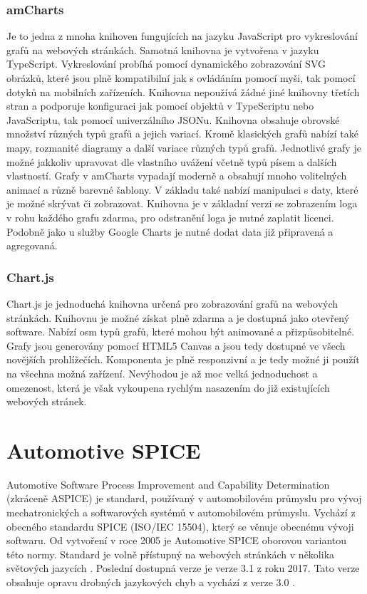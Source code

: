 \documentclass[czech,master]{diploma}
\begin{document}
\subsection{amCharts}
\label{sec:amcharts}
Je to jedna z mnoha knihoven fungujících na jazyku JavaScript pro vykreslování grafů na webových stránkách. Samotná knihovna je vytvořena v jazyku TypeScript. Vykreslování probíhá pomocí dynamického zobrazování SVG obrázků, které jsou plně kompatibilní jak s ovládáním pomocí myši, tak pomocí dotyků na mobilních zařízeních. Knihovna nepoužívá žádné jiné knihovny třetích stran a podporuje konfiguraci jak pomocí objektů v TypeScriptu nebo JavaScriptu, tak pomocí univerzálního JSONu. Knihovna obsahuje obrovské množství různých typů grafů a jejich variací. Kromě klasických grafů nabízí také mapy, rozmanité diagramy a další variace různých typů grafů. Jednotlivé grafy je možné jakkoliv upravovat dle vlastního uvážení včetně typů písem a dalších vlastností. Grafy v amCharts vypadají moderně a obsahují mnoho volitelných animací a různě barevné šablony.  V základu také nabízí manipulaci s daty, které je možné skrývat či zobrazovat. Knihovna je v základní verzi se zobrazením loga v rohu každého grafu zdarma, pro odstranění loga je nutné zaplatit licenci. Podobně jako u služby Google Charts je nutné dodat data již připravená a agregovaná. \cite{ref:amcharts_web}

\subsection{Chart.js}
\label{sec:chartjs}
Chart.js je jednoduchá knihovna určená pro zobrazování grafů na webových stránkách. Knihovnu je možné získat plně zdarma a je dostupná jako otevřený software. Nabízí osm typů grafů, které mohou být animované a přizpůsobitelné. Grafy jsou generovány pomocí HTML5 Canvas a jsou tedy dostupné ve všech novějších prohlížečích. Komponenta je plně responzivní a je tedy možné ji použít na všechna možná zařízení. Nevýhodou je až moc velká jednoduchost a omezenost, která je však vykoupena rychlým nasazením do již existujících webových stránek. \cite{ref:chartjs}



\chapter{Automotive SPICE}
\label{sec:aspice}
Automotive Software Process Improvement and Capability Determination (zkráceně ASPICE) je standard, používaný v automobilovém průmyslu pro vývoj mechatronických a softwarových systémů v automobilovém průmyslu. Vychází z obecného standardu SPICE (ISO/IEC 15504), který se věnuje obecnému vývoji softwaru. Od vytvoření v roce 2005 je Automotive SPICE oborovou variantou této normy. Standard je volně přístupný na webových stránkách v několika světových jazycích \cite{ref:aspice_download_obecne}. Poslední dostupná verze je verze 3.1 z roku 2017. Tato verze obsahuje opravu drobných jazykových chyb a vychází z verze 3.0 \cite{ref:aspice_download_verze}.
\end{document}
